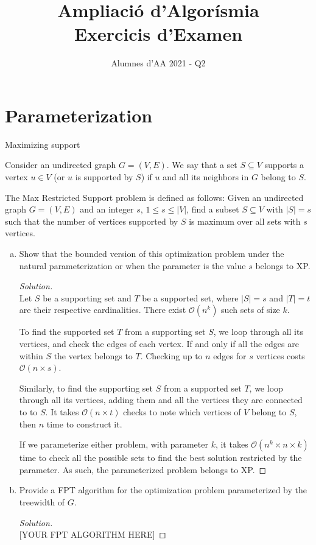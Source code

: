 \documentclass{article}
\newenvironment{problem}[2][Problem]{\begin{trivlist}
\item[\hskip \labelsep {\bfseries #1}\hskip \labelsep {\bfseries #2.}]}{\end{trivlist}}
\newenvironment{solution}{\begin{proof}[Solution]}{\end{proof}}
\newcommand{\bigO}{\mathcal{O}}
\begin{document}
\title{Ampliació d'Algorísmia\\Exercicis d'Examen}
\author{Alumnes d'AA 2021 - Q2}

\maketitle
\section*{Parameterization}
\begin{problem}{5} Maximizing support

Consider an undirected graph $G = (V, E)$. We say that a set $S \subseteq V$ supports a vertex $u \in V$
(or $u$ is supported by $S$) if $u$ and all its neighbors in $G$ belong to $S$.

The Max Restricted Support problem is defined as follows: Given an undirected graph $G = (V, E)$ and an integer $s$,
$1 \leq s \leq |V|$, find a subset $S \subseteq V$ with $|S| = s$ such that the number of vertices supported by $S$
is maximum over all sets with $s$ vertices.

\begin{enumerate}[a)]
\item Show that the bounded version of this optimization problem under the natural parameterization or when the parameter
is the value $s$ belongs to {\large XP}.

\begin{solution}\ \\
Let $S$ be a supporting set and $T$ be a supported set, where $|S| = s$ and $|T| = t$ are their respective cardinalities. There exist $\bigO(n^k)$ such sets of size $k$.

To find the supported set $T$ from a supporting set $S$, we loop through all its vertices, and check the edges of each vertex. If and only if all the edges are within $S$ the vertex belongs to $T$. Checking up to $n$ edges for $s$ vertices costs $\bigO(n \times s)$.

Similarly, to find the supporting set $S$ from a supported set $T$, we loop through all its vertices, adding them and all the vertices they are connected to to $S$. It takes $\bigO(n \times t)$ checks to note which vertices of $V$ belong to $S$, then $n$ time to construct it.

If we parameterize either problem, with parameter $k$, it takes $\bigO(n^k \times n \times k)$ time to check all the possible sets to find the best solution restricted by the parameter. As such, the parameterized problem belongs to {\large XP}.
\end{solution}

\item Provide a {\large FPT} algorithm for the optimization problem parameterized by the treewidth of $G$.

\begin{solution}\ \\
\Huge [YOUR FPT ALGORITHM HERE]
\end{solution}

\end{enumerate}
\end{problem}
\end{document}
